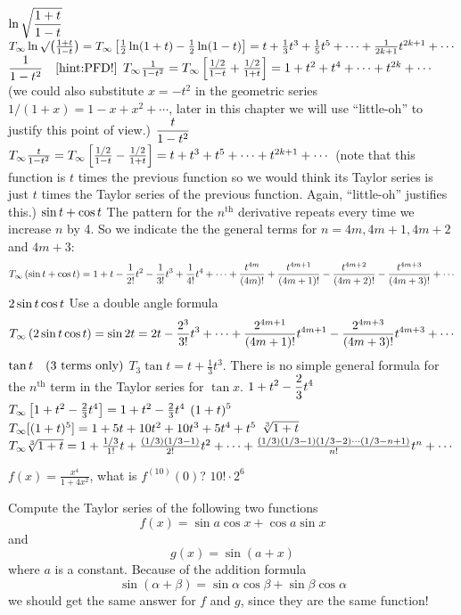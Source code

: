 \begin{multicols}{2}
\problem $\displaystyle \ln\sqrt{\frac{1+t}{1-t}}$ %
\answer %
$T_{\infty} \ln \surd\bigl(\frac{1+t}{1-t}\bigr) = T_{\infty}\left[
\frac12\ln(1+t)-\frac12\ln(1-t)\right] = t + \frac13t^3 +
\frac15t^5 + \cdots + \frac1{2k+1}t^{2k+1} + \cdots$
\endanswer
\problem $\displaystyle \frac{1}{1-t^2} \quad\text{[hint:PFD!]}$ %
\answer %
$T_{\infty} \frac1{1-t^2} = T_{\infty}\left[ \frac{1/2}{1-t}+\frac{1/2}{1+t}
\right]= 1+t^2+t^4+\cdots+t^{2k}+\cdots$ (we could also substitute
$x=-t^2$ in the geometric series $1/(1+x) = 1-x+x^2+\cdots$, later in
this chapter we will use ``little-oh'' to justify this point of
view.)
\endanswer
\problem $\displaystyle \frac t{1-t^2}$ %
\answer %
$T_{\infty} \frac{t}{1-t^2} = T_{\infty}\left[ \frac{1/2}{1-t}-\frac{1/2}{1+t}
\right] = t+t^3+t^5+\cdots+t^{2k+1}+\cdots$ (note that this function
is $t$ times the previous function so we would think its Taylor
series is just $t$ times the Taylor series of the previous function.
Again, ``little-oh'' justifies this.)
\endanswer
\problem $\displaystyle \sin t + \cos t$ %
\answer %
The pattern for the $n^{\text{th}}$ derivative repeats every time we
increase $n$ by 4.  So we indicate the the general terms for $n=4m,
4m+1, 4m+2$ and $4m+3$:
\[
T_{\infty}\left( \sin t+\cos t \right)=
1+t-\frac1{2!}t^2-\frac1{3!}t^3+\frac1{4!}t^4+\cdots
+\frac{t^{4m}}{(4m)!}+\frac{t^{4m+1}}{(4m+1)!}
-\frac{t^{4m+2}}{(4m+2)!}-\frac{t^{4m+3}}{(4m+3)!}  +\cdots
\]
\endanswer
\problem $\displaystyle 2\sin t\cos t $ %
\answer %
Use a double angle formula
\[
T_{\infty}\left( 2\sin t\cos t \right) = \sin 2t = 2t -
\frac{2^3}{3!}t^3+\cdots+\frac{2^{4m+1}}{(4m+1)!}t^{4m+1}
-\frac{2^{4m+3}}{(4m+3)!}t^{4m+3}+\cdots
\]
\endanswer
\problem $\displaystyle \tan t \text{\quad (3 terms only)} $ %
\answer %
$T_3\tan t = t +\frac13 t^3 $.  There is no simple general formula
for the $n^{\text{th}}$ term in the Taylor series for $\tan x$.
\endanswer
\problem $\displaystyle 1+t^2-\frac23t^4$ %
\answer %
$T_{\infty} \left[ 1+t^2-\frac23t^4 \right] =1+t^2-\frac23t^4$
\endanswer
\problem $\displaystyle (1+t)^5$ %
\answer %
$T_{\infty}[(1+t)^5] = 1+5t+10t^2+10t^3+5t^4+t^5$
\endanswer
\problem $\displaystyle \sqrt[3]{1+t}$ %
\answer %
$T_{\infty}\sqrt[3]{1+t} = 1 + \frac{1/3}{1!}t+\frac{(1/3)(1/3-1)}{2!}t^2
+\cdots+\frac{(1/3)(1/3-1)(1/3-2)\cdots(1/3-n+1)}{n!}t^n+\cdots$
\endanswer

\problem $f(x)=\frac{x^4}{1+4x^2}$, what is $f^{(10)}(0)$? %
\answer %
$10! \cdot 2^6$
\endanswer

\problem \groupproblem  Compute the Taylor series of the following two functions %
\[
f(x) = \sin a\cos x+\cos a\sin x
\]
and
\[
g(x) = \sin (a+x)
\]
where $a$ is a constant.
\answer %
Because of the addition formula
\[
\sin(\alpha+\beta) = \sin\alpha\cos\beta + \sin\beta\cos\alpha
\]
we should get the same answer for $f$ and $g$, since they are the
same function!


\end{multicols}
